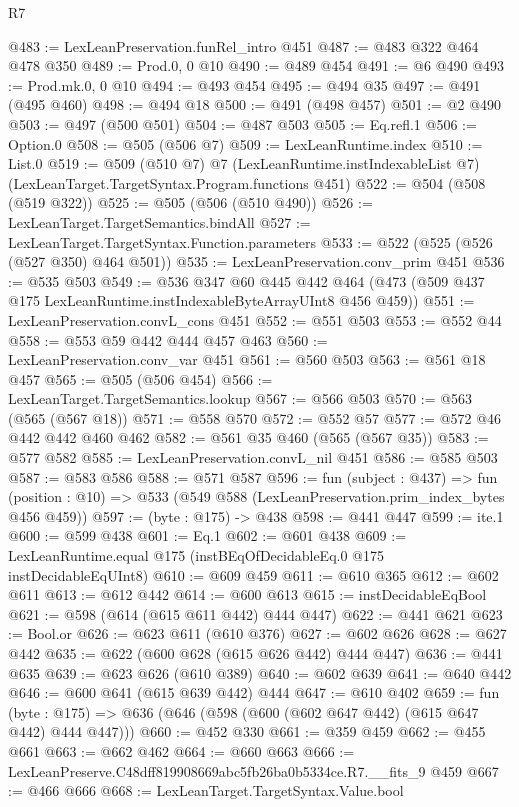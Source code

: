 \begin{lexlean}{R7}
\begin{coremodule}
@483 := LexLeanPreservation.funRel_intro @451
@487 := @483 @322 @464 @478 @350
@489 := Prod.{0, 0} @10
@490 := @489 @454
@491 := @6 @490
@493 := Prod.mk.{0, 0} @10
@494 := @493 @454
@495 := @494 @35
@497 := @491 (@495 @460)
@498 := @494 @18
@500 := @491 (@498 @457)
@501 := @2 @490
@503 := @497 (@500 @501)
@504 := @487 @503
@505 := Eq.refl.{1}
@506 := Option.{0}
@508 := @505 (@506 @7)
@509 := LexLeanRuntime.index
@510 := List.{0}
@519 := @509
    (@510 @7)
    @7
    (LexLeanRuntime.instIndexableList @7)
    (LexLeanTarget.TargetSyntax.Program.functions @451)
@522 := @504 (@508 (@519 @322))
@525 := @505 (@506 (@510 @490))
@526 := LexLeanTarget.TargetSemantics.bindAll
@527 := LexLeanTarget.TargetSyntax.Function.parameters
@533 := @522 (@525 (@526 (@527 @350) @464 @501))
@535 := LexLeanPreservation.conv_prim @451
@536 := @535 @503
@549 := @536
    @347
    @60
    @445
    @442
    @464
    (@473 (@509 @437 @175 LexLeanRuntime.instIndexableByteArrayUInt8 @456 @459))
@551 := LexLeanPreservation.convL_cons @451
@552 := @551 @503
@553 := @552 @44
@558 := @553 @59 @442 @444 @457 @463
@560 := LexLeanPreservation.conv_var @451
@561 := @560 @503
@563 := @561 @18 @457
@565 := @505 (@506 @454)
@566 := LexLeanTarget.TargetSemantics.lookup
@567 := @566 @503
@570 := @563 (@565 (@567 @18))
@571 := @558 @570
@572 := @552 @57
@577 := @572 @46 @442 @442 @460 @462
@582 := @561 @35 @460 (@565 (@567 @35))
@583 := @577 @582
@585 := LexLeanPreservation.convL_nil @451
@586 := @585 @503
@587 := @583 @586
@588 := @571 @587
@596 := fun (subject : @437) =>
  fun (position : @10) => @533 (@549 @588 (LexLeanPreservation.prim_index_bytes @456 @459))
@597 := (byte : @175) -> @438
@598 := @441 @447
@599 := ite.{1}
@600 := @599 @438
@601 := Eq.{1}
@602 := @601 @438
@609 := LexLeanRuntime.equal @175 (instBEqOfDecidableEq.{0} @175 instDecidableEqUInt8)
@610 := @609 @459
@611 := @610 @365
@612 := @602 @611
@613 := @612 @442
@614 := @600 @613
@615 := instDecidableEqBool
@621 := @598 (@614 (@615 @611 @442) @444 @447)
@622 := @441 @621
@623 := Bool.or
@626 := @623 @611 (@610 @376)
@627 := @602 @626
@628 := @627 @442
@635 := @622 (@600 @628 (@615 @626 @442) @444 @447)
@636 := @441 @635
@639 := @623 @626 (@610 @389)
@640 := @602 @639
@641 := @640 @442
@646 := @600 @641 (@615 @639 @442) @444
@647 := @610 @402
@659 := fun (byte : @175) => @636 (@646 (@598 (@600 (@602 @647 @442) (@615 @647 @442) @444 @447)))
@660 := @452 @330
@661 := @359 @459
@662 := @455 @661
@663 := @662 @462
@664 := @660 @663
@666 := LexLeanPreserve.C48dff819908669abc5fb26ba0b5334ce.R7.__fits_9 @459
@667 := @466 @666
@668 := LexLeanTarget.TargetSyntax.Value.bool

\end{coremodule}
\end{lexlean}
